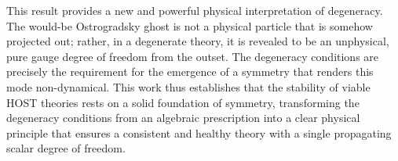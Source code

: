 \documentclass[twocolumn]{aastex631}
\begin{document}
This result provides a new and powerful physical interpretation of degeneracy. The would-be Ostrogradsky ghost is not a physical particle that is somehow projected out; rather, in a degenerate theory, it is revealed to be an unphysical, pure gauge degree of freedom from the outset. The degeneracy conditions are precisely the requirement for the emergence of a symmetry that renders this mode non-dynamical. This work thus establishes that the stability of viable HOST theories rests on a solid foundation of symmetry, transforming the degeneracy conditions from an algebraic prescription into a clear physical principle that ensures a consistent and healthy theory with a single propagating scalar degree of freedom.

{}

\end{document}
